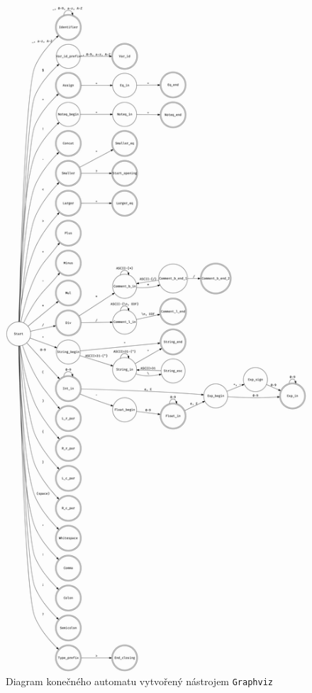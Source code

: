 \documentclass[11pt,a4paper]{article}
\begin{document}
    \begin{figure}[H]
        \centering
        \includegraphics[height=0.97\textheight]{fsm.jpg}
        \caption{Diagram konečného automatu vytvořený nástrojem \texttt{Graphviz}}
        \label{fig:fsm}
    \end{figure}
\end{document}
